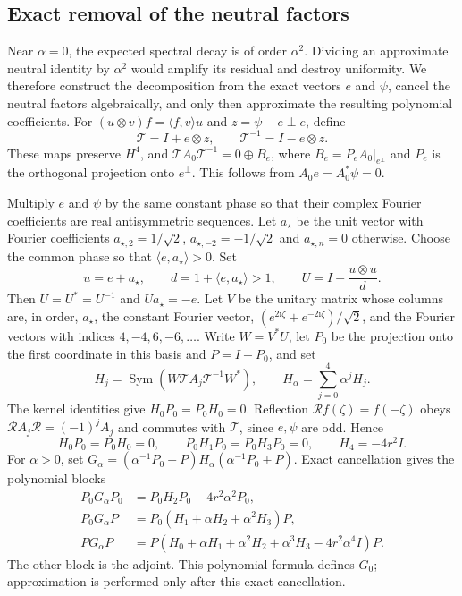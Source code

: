 \documentclass[a4paper,11pt]{article}
\numberwithin{equation}{section}
\theoremstyle{definition}
\theoremstyle{remark}
\newcommand{\ii}{\mathrm i}
\newcommand{\Sym}{\operatorname{Sym}}
\newcommand{\ip}[2]{\langle#1,#2\rangle}
\newcommand{\calT}{\mathcal T}
\newcommand{\calR}{\mathcal R}
\newcommand{\avec}{a_\star}
\begin{document}
\subsection{Exact removal of the neutral factors}
Near $\alpha=0$, the expected spectral decay is of order $\alpha^2$. Dividing an approximate neutral identity by $\alpha^2$ would amplify its residual and destroy uniformity. We therefore construct the decomposition from the exact vectors $e$ and $\psi$, cancel the neutral factors algebraically, and only then approximate the resulting polynomial coefficients.
For $(u\otimes v)f=\ip f v u$ and $z=\psi-e\perp e$, define
\begin{equation}\label{eq:T}
 \calT=I+e\otimes z,\qquad \calT^{-1}=I-e\otimes z.
\end{equation}
These maps preserve $H^4$, and $\calT A_0\calT^{-1}=0\oplus B_e$, where $B_e=P_eA_0|_{e^\perp}$ and $P_e$ is the orthogonal projection onto $e^\perp$. This follows from $A_0e=A_0^*\psi=0$.

Multiply $e$ and $\psi$ by the same constant phase so that their complex Fourier coefficients are real antisymmetric sequences. Let $\avec$ be the unit vector with Fourier coefficients $a_{\star,2}=1/\sqrt2$, $a_{\star,-2}=-1/\sqrt2$ and $a_{\star,n}=0$ otherwise. Choose the common phase so that $\ip e{\avec}>0$. Set
\begin{equation}\label{eq:householder}
 u=e+\avec,\qquad d=1+\ip e{\avec}>1,\qquad U=I-\frac{u\otimes u}{d}.
\end{equation}
Then $U=U^*=U^{-1}$ and $U\avec=-e$. Let $V$ be the unitary matrix whose columns are, in order, $\avec$, the constant Fourier vector, $(e^{2\ii\zeta}+e^{-2\ii\zeta})/\sqrt2$, and the Fourier vectors with indices $4,-4,6,-6,\ldots$. Write $W=V^*U$, let $P_0$ be the projection onto the first coordinate in this basis and $P=I-P_0$, and set
\[
 H_j=\Sym(W\calT A_j\calT^{-1}W^*),\qquad H_\alpha=\sum_{j=0}^4\alpha^jH_j.
\]
The kernel identities give $H_0P_0=P_0H_0=0$. Reflection $\calR f(\zeta)=f(-\zeta)$ obeys $\calR A_j\calR=(-1)^jA_j$ and commutes with $\calT$, since $e,\psi$ are odd. Hence
\begin{equation}\label{eq:exact-zeros}
 H_0P_0=P_0H_0=0,\qquad
 P_0H_1P_0=P_0H_3P_0=0,\qquad H_4=-4r^2I.
\end{equation}
For $\alpha>0$, set $G_\alpha=(\alpha^{-1}P_0+P)H_\alpha(\alpha^{-1}P_0+P)$. Exact cancellation gives the polynomial blocks
\begin{equation}\label{eq:G}
 \begin{aligned}
 P_0G_\alpha P_0&=P_0H_2P_0-4r^2\alpha^2P_0,\\
 P_0G_\alpha P&=P_0(H_1+\alpha H_2+\alpha^2H_3)P,\\
 PG_\alpha P&=P(H_0+\alpha H_1+\alpha^2H_2+\alpha^3H_3-4r^2\alpha^4I)P.
 \end{aligned}
\end{equation}
The other block is the adjoint. This polynomial formula defines $G_0$; approximation is performed only after this exact cancellation.
\end{document}

